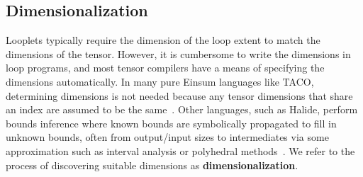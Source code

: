 \subsection{Dimensionalization}
    Looplets typically require the dimension of the loop extent to match the dimensions of the tensor. 
    However, it is cumbersome to write the dimensions
    in loop programs, and most tensor compilers have a means of specifying the dimensions automatically.
    In many pure Einsum languages like TACO, determining dimensions
    is not needed because any tensor dimensions that share an index are assumed to be the same~\cite{kjolstad_tensor_2017}.
    Other languages, such as Halide, perform bounds inference where
    known bounds are symbolically propagated to fill in unknown bounds, often from output/input sizes to intermediates via some approximation such as interval analysis or polyhedral methods~\cite{ragan-kelley_halide_2013, grosser2012polly}.
    We refer to the process of discovering suitable
    dimensions as \textbf{dimensionalization}. 

